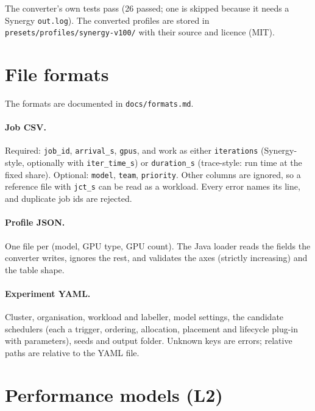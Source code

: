 \documentclass[11pt,a4paper]{article}
\newcommand{\code}[1]{\texttt{#1}}
\begin{document}
The converter's own tests pass (26 passed; one is skipped because it needs a Synergy \code{out.log}).
The converted profiles are stored in \code{presets/profiles/synergy-v100/} with their source and
licence (MIT).

\section{File formats}

The formats are documented in \code{docs/formats.md}.

\paragraph{Job CSV.} Required: \code{job\_id}, \code{arrival\_s}, \code{gpus}, and work as either
\code{iterations} (Synergy-style, optionally with \code{iter\_time\_s}) or \code{duration\_s}
(trace-style: run time at the fixed share). Optional: \code{model}, \code{team}, \code{priority}.
Other columns are ignored, so a reference file with \code{jct\_s} can be read as a workload. Every
error names its line, and duplicate job ids are rejected.

\paragraph{Profile JSON.} One file per (model, GPU type, GPU count). The Java loader reads the
fields the converter writes, ignores the rest, and validates the axes (strictly increasing) and the
table shape.

\paragraph{Experiment YAML.} Cluster, organisation, workload and labeller, model settings, the
candidate schedulers (each a trigger, ordering, allocation, placement and lifecycle plug-in with
parameters), seeds and output folder. Unknown keys are errors; relative paths are relative to the
YAML file.

\section{Performance models (L2)}
\end{document}
